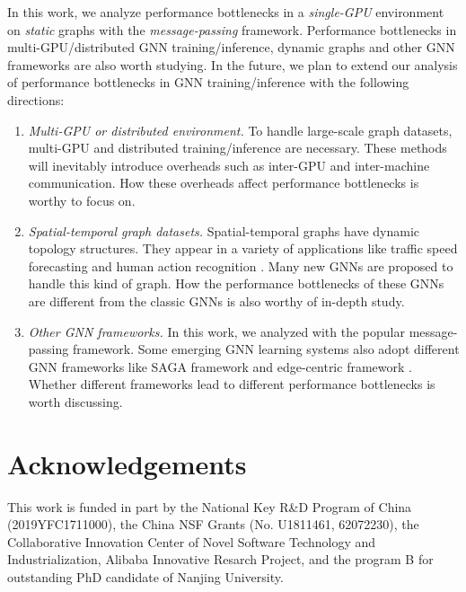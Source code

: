 In this work, we analyze performance bottlenecks in a \emph{single-GPU} environment on \emph{static} graphs with the \emph{message-passing} framework.
%
Performance bottlenecks in multi-GPU/distributed GNN training/inference, dynamic graphs and other GNN frameworks are also worth studying.
%
In the future, we plan to extend our analysis of performance bottlenecks in GNN training/inference with the following directions:
%
\begin{enumerate}
    \item \emph{Multi-GPU or distributed environment.}
    To handle large-scale graph datasets, multi-GPU and distributed training/inference are necessary.
    These methods will inevitably introduce overheads such as inter-GPU and inter-machine communication. 
    How these overheads affect performance bottlenecks is worthy to focus on.
    \item \emph{Spatial-temporal graph datasets.}
    Spatial-temporal graphs have dynamic topology structures.
    They appear in a variety of applications like traffic speed forecasting \cite{li2018_DCRNN} and human action recognition \cite{yan2018_STGCN}.
    Many new GNNs are proposed to handle this kind of graph.
    How the performance bottlenecks of these GNNs are different from the classic GNNs is also worthy of in-depth study.
    \item \emph{Other GNN frameworks.}
    In this work, we analyzed with the popular message-passing framework.
    Some emerging GNN learning systems also adopt different GNN frameworks like SAGA framework \cite{ma2019_neugraph} and edge-centric framework \cite{he2019_EnGN}.
    Whether different frameworks lead to different performance bottlenecks is worth discussing.
\end{enumerate}
\section*{Acknowledgements}

This work is funded in part by the National Key R\&D Program of China (2019YFC1711000), the China NSF Grants (No. U1811461, 62072230), the Collaborative Innovation Center of Novel Software Technology and Industrialization, Alibaba Innovative Resarch Project, and the program B for outstanding PhD candidate of Nanjing University.

